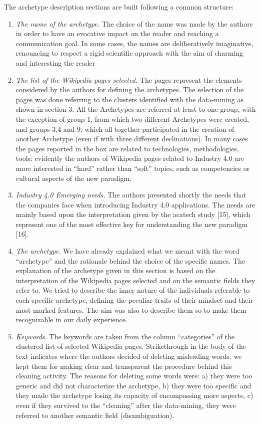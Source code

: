 \documentclass[b5paper,]{book}
\theoremstyle{definition}
\theoremstyle{definition}
\theoremstyle{definition}
\theoremstyle{remark}
\begin{document}
The archetype description sections are built following a common
structure:

\begin{enumerate}
\def\labelenumi{\arabic{enumi}.}
\item
  \emph{The name of the archetype.} The choice of the name was made by
  the authors in order to have an evocative impact on the reader and
  reaching a communication goal. In some cases, the names are
  deliberatively imaginative, renouncing to respect a rigid scientific
  approach with the aim of charming and interesting the reader
\item
  \emph{The list of the Wikipedia pages selected.} The pages represent
  the elements considered by the authors for defining the archetypes.
  The selection of the pages was done referring to the clusters
  identified with the data-mining as shown in section 3. All the
  Archetypes are referred at least to one group, with the exception of
  group 1, from which two different Archetypes were created, and groups
  3,4 and 9, which all together participated in the creation of another
  Archetype (even if with three different declinations). In many cases
  the pages reported in the box are related to technologies,
  methodologies, tools: evidently the authors of Wikipedia pages related
  to Industry 4.0 are more interested in ``hard'' rather than ``soft''
  topics, such as competencies or cultural aspects of the new paradigm.
\item
  \emph{Industry 4.0 Emerging needs.} The authors presented shortly the
  needs that the companies face when introducing Industry 4.0
  applications. The needs are mainly based upon the interpretation given
  by the acatech study {[}15{]}, which represent one of the most
  effective key for understanding the new paradigm {[}16{]}.
\item
  \emph{The archetype.} We have already explained what we meant with the
  word ``archetype'' and the rationale behind the choice of the specific
  names. The explanation of the archetype given in this section is based
  on the interpretation of the Wikipedia pages selected and on the
  semantic fields they refer to. We tried to describe the inner nature
  of the individuals referable to each specific archetype, defining the
  peculiar traits of their mindset and their most marked features. The
  aim was also to describe them so to make them recognizable in our
  daily experience.
\item
  \emph{Keywords.} The keywords are taken from the column ``categories''
  of the clustered list of selected Wikipedia pages. Strikethrough in
  the body of the text indicates where the authors decided of deleting
  misleading words: we kept them for making clear and transparent the
  procedure behind this cleaning activity. The reasons for deleting some
  words were: a) they were too generic and did not characterize the
  archetype, b) they were too specific and they made the archetype
  losing its capacity of encompassing more aspects, c) even if they
  survived to the ``cleaning'' after the data-mining, they were referred
  to another semantic field (disambiguation).
\end{enumerate}
\end{document}
